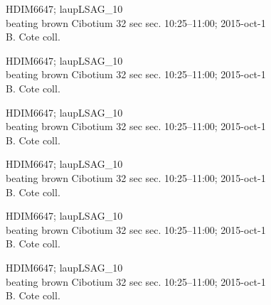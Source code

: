 \documentclass[2pt]{extarticle}
\begin{document}
\noindent
\parbox{0.16\textwidth}{\tiny \raggedright \rule[-0.3\baselineskip]{0pt}{10pt}HDIM6647; laupLSAG\_10\\ beating brown Cibotium 32 sec sec. 10:25--11:00; 2015-oct-1\\ B. Cote coll.}
\parbox{0.16\textwidth}{\tiny \raggedright \rule[-0.3\baselineskip]{0pt}{10pt}HDIM6647; laupLSAG\_10\\ beating brown Cibotium 32 sec sec. 10:25--11:00; 2015-oct-1\\ B. Cote coll.}
\parbox{0.16\textwidth}{\tiny \raggedright \rule[-0.3\baselineskip]{0pt}{10pt}HDIM6647; laupLSAG\_10\\ beating brown Cibotium 32 sec sec. 10:25--11:00; 2015-oct-1\\ B. Cote coll.}
\parbox{0.16\textwidth}{\tiny \raggedright \rule[-0.3\baselineskip]{0pt}{10pt}HDIM6647; laupLSAG\_10\\ beating brown Cibotium 32 sec sec. 10:25--11:00; 2015-oct-1\\ B. Cote coll.}
\parbox{0.16\textwidth}{\tiny \raggedright \rule[-0.3\baselineskip]{0pt}{10pt}HDIM6647; laupLSAG\_10\\ beating brown Cibotium 32 sec sec. 10:25--11:00; 2015-oct-1\\ B. Cote coll.}
\parbox{0.16\textwidth}{\tiny \raggedright \rule[-0.3\baselineskip]{0pt}{10pt}HDIM6647; laupLSAG\_10\\ beating brown Cibotium 32 sec sec. 10:25--11:00; 2015-oct-1\\ B. Cote coll.} \\ 
\vspace{0.001in} 
\end{document}
